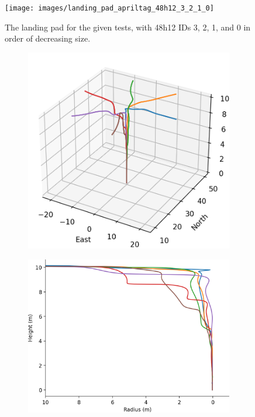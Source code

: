 \begin{figure}
    \centering
    \texttt{[image: images/landing\_pad\_apriltag\_48h12\_3\_2\_1\_0]}
    \caption{The landing pad for the given tests, with 48h12 IDs 3, 2, 1, and 0 in order of decreasing size.}
    \label{figure:landing_pad_apriltag_48h12_3_2_1_0}
\end{figure}

\begin{figure}
    \center
    \begin{subfigure}[b]{0.49\textwidth}
         \centering
         \includegraphics[width=\textwidth]{images/landing_trajectories}
    \end{subfigure}
    \hfill
    \begin{subfigure}[b]{0.49\textwidth}
         \centering
         \includegraphics[width=\textwidth]{images/radius_vs_height}

\end{subfigure}
\end{figure}

